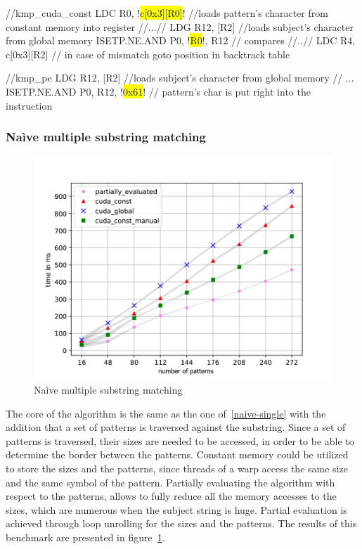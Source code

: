 \begin{code}[language=C,caption=KMP partial evaluation,label=code:kmp_spec,escapechar=!]
    //kmp_cuda_const
LDC R0, !\colorbox{yellow}{c[0x3][R0]}! //loads pattern's character from constant memory into register
    //...//
LDG R12, [R2] //loads subject's character from global memory
ISETP.NE.AND P0, !\colorbox{yellow}{R0}!, R12 // compares
    //..//
LDC R4, c[0x3][R2] // in case of mismatch goto position in backtrack table

    //kmp_pe
LDG R12, [R2] //loads subject's character from global memory
    //    ...
ISETP.NE.AND P0, R12, !\colorbox{yellow}{0x61}! // pattern's char is put right into the instruction
\end{code}

\subsubsection{Na\`ive multiple substring matching}\label{nmsm}

\begin{figure}
    \centering
    \includegraphics{figures/PredDefendNaiveSearch.pdf}
    \caption{Na\`ive multiple substring matching}
    \label{fig:naive_multy}
\end{figure}
The core of the algorithm is the same as the one of~\ref{naive-single} with the addition that a set of patterns is traversed against the substring. Since a set of patterns is traversed, their sizes are needed to be accessed, in order to be able to determine the border between the patterns. Constant memory could be utilized to store the sizes and the patterns, since threads of a warp access the same size and the same symbol of the pattern. Partially evaluating the algorithm with respect to the patterns, allows to fully reduce all the memory accesses to the sizes, which are numerous when the subject string is huge. Partial evaluation is achieved through loop unrolling for the sizes and the patterns. The results of this benchmark are presented in figure~\ref{fig:naive_multy}.

